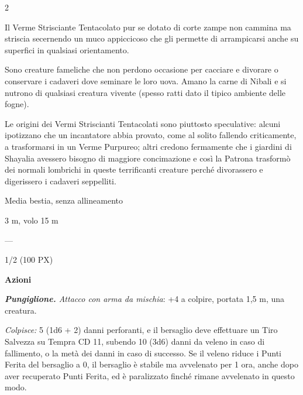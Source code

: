 \begin{multicols}{2}
{Il Verme Strisciante Tentacolato pur se dotato di corte zampe non cammina ma striscia secernendo un muco appiccicoso che gli permette di arrampicarsi anche su superfici in qualsiasi orientamento.

Sono creature fameliche che non perdono occasione per cacciare e divorare o conservare i cadaveri dove seminare le loro uova. Amano la carne di Nibali e si nutrono di qualsiasi creatura vivente (spesso ratti dato il tipico ambiente delle fogne).

Le origini dei Vermi Striscianti Tentacolati sono piuttosto speculative: alcuni ipotizzano che un incantatore abbia provato, come al solito fallendo criticamente, a trasformarsi in un Verme Purpureo; altri credono fermamente che i giardini di Shayalia avessero bisogno di maggiore concimazione e così la Patrona trasformò dei normali lombrichi in queste terrificanti creature perché divorassero e digerissero i cadaveri seppelliti.

\label{vespagigante}
\begin{description}[noitemsep, topsep=0pt, parsep=0pt, partopsep=0pt, itemsep=1pt, leftmargin=2.35cm,  labelwidth=2.2cm, itemindent=0cm, listparindent=0pt] %
\setlength{\baselineskip}{10pt}
\item[\textbf{Taglia/Tipo}] Media bestia, senza allineamento
\item[\textbf{Caratt.}] 
\item[\textbf{Punti Ferita}] 
\item[\textbf{Movimento}] 3 m, volo 15 m
\item[\textbf{Sensi}] 
\item[\textbf{Linguaggi}] ---
\item[\textbf{Sfida}] 1/2 (100 PX)
\end{description}
\smallskip

\textbf{Azioni}

\emph{\textbf{Pungiglione.} Attacco con arma da mischia}: +4 a colpire, portata 1,5 m, una creatura.

\emph{Colpisce:} 5 (1d6 + 2) danni perforanti, e il bersaglio deve effettuare un Tiro Salvezza su Tempra CD 11, subendo 10 (3d6) danni da veleno in caso di fallimento, o la metà dei danni in caso di successo. Se il veleno riduce i Punti Ferita del bersaglio a 0, il bersaglio è stabile ma avvelenato per 1 ora, anche dopo aver recuperato Punti Ferita, ed è paralizzato finché rimane avvelenato in questo modo.

}
\end{multicols}
